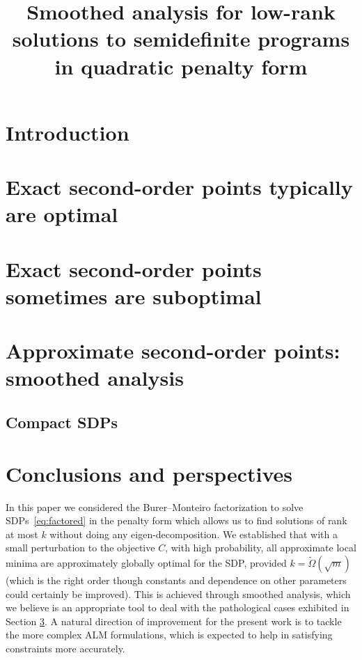 \documentclass[final, 12pt]{colt2018}
\title[Smoothed analysis for factored, penalized SDPs]{Smoothed analysis for low-rank solutions to semidefinite programs\\in quadratic penalty form} %
\begin{document}
\maketitle

\begin{abstract}

\end{abstract}



\section{Introduction}
\label{sec:intro}


\section{Exact second-order points typically are optimal}
\label{sec:exact}


\section{Exact second-order points sometimes are suboptimal}
\label{sec:exact_sub}


\section{Approximate second-order points: smoothed analysis}
\label{sec:smooth}


\subsection{Compact SDPs} \label{sec:compact}









\section{Conclusions and perspectives}
\label{sec:conc}
In this paper we considered the Burer--Monteiro factorization to solve SDPs~\eqref{eq:factored} in the penalty form which allows us to find solutions of rank at most $k$ without doing any eigen-decomposition. We established that with a small perturbation to the objective $C$, with high probability, all approximate local minima are approximately globally optimal for the SDP, provided $k = \tilde \Omega(\sqrt{m})$ (which is the right order though constants and dependence on other parameters could certainly be improved). This is achieved through smoothed analysis, which we believe is an appropriate tool to deal with the pathological cases exhibited in Section \ref{sec:exact_sub}.  A natural direction of improvement for the present work is to tackle the more complex ALM formulations, which is expected to help in satisfying constraints more accurately.
\end{document}

